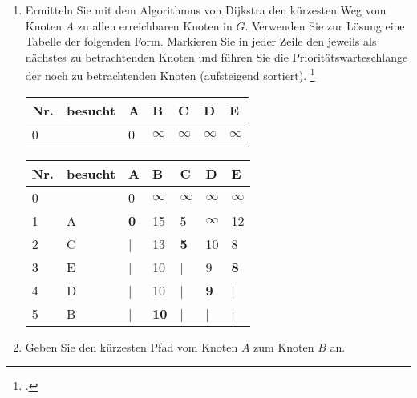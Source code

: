 \documentclass{lehramt-informatik-aufgabe}
\begin{document}
\begin{enumerate}


\item Ermitteln Sie mit dem Algorithmus von Dijkstra den kürzesten Weg
vom Knoten $A$ zu allen erreichbaren Knoten in $G$. Verwenden Sie zur
Lösung eine Tabelle der folgenden Form. Markieren Sie in jeder Zeile den
jeweils als nächstes zu betrachtenden Knoten und führen Sie die
Prioritätswarteschlange der noch zu betrachtenden Knoten (aufsteigend
sortiert).
\footcite{examen:66115:2020:09}

\begin{tabular}{lllllll}
\bf{Nr.}     & \bf{besucht} & \bf{A}       & \bf{B}       & \bf{C}       & \bf{D}       & \bf{E}       \\
\hline
0            &              & 0            & $\infty$     & $\infty$     & $\infty$     & $\infty$     \\
\end{tabular}

\begin{liAntwort}
\begin{tabular}{lllllll}
\bf{Nr.}     & \bf{besucht} & \bf{A}       & \bf{B}       & \bf{C}       & \bf{D}       & \bf{E}       \\
\hline
0            &              & 0            & $\infty$     & $\infty$     & $\infty$     & $\infty$     \\
1            & A            & \bf{0}       & 15           & 5            & $\infty$     & 12           \\
2            & C            & |            & 13           & \bf{5}       & 10           & 8            \\
3            & E            & |            & 10           & |            & 9            & \bf{8}       \\
4            & D            & |            & 10           & |            & \bf{9}       & |            \\
5            & B            & |            & \bf{10}      & |            & |            & |            \\
\end{tabular}
\end{liAntwort}


\item Geben Sie den kürzesten Pfad vom Knoten $A$ zum Knoten $B$ an.


\end{enumerate}
\end{document}
